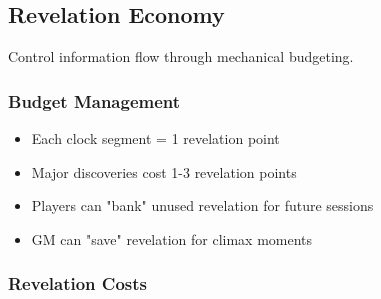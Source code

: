\subsection{Revelation Economy}

Control information flow through mechanical budgeting.

\subsubsection{Budget Management}

\begin{itemize}
\item Each clock segment = 1 revelation point
\item Major discoveries cost 1-3 revelation points
\item Players can "bank" unused revelation for future sessions
\item GM can "save" revelation for climax moments
\end{itemize}

\subsubsection{Revelation Costs}

